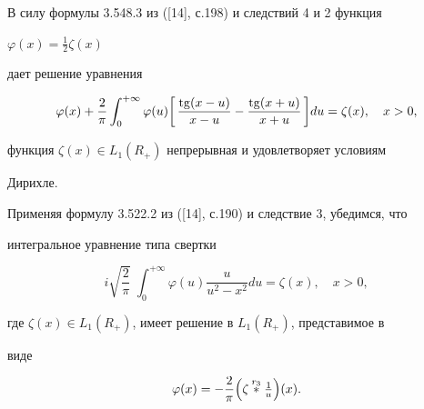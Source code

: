 \begin{exam}


В силу формулы 3.548.3 из ([14], с.198) и следствий 4 и 2 функция


$\varphi(x)=\frac{1}{2}\zeta(x)$


дает решение уравнения


$$


\varphi(x)+\frac{2}{\pi}\int^{+\infty}_0\varphi(u)


\biggl[\,\frac{\tg(x-u)}{x-u}-


\frac{\tg(x+u)}{x+u}\,\biggr]du=\zeta(x),\quad x>0,


$$


функция $\zeta(x)\in L_1(R_+)$ непрерывная и удовлетворяет условиям


Дирихле.


\end{exam}





\begin{exam}


Применяя формулу 3.522.2 из ([14], с.190) и следствие 3, убедимся, что


интегральное уравнение типа свертки


$$


i\sqrt{\frac{2}{\pi}}\;\int^{+\infty}_0\varphi(u)


\frac{u}{u^2-x^2}du=\zeta(x),\quad x>0,


$$


где $\zeta(x)\in L_1(R_+)$, имеет решение в $L_1(R_+)$, представимое в


виде


$$


\varphi(x)=-\frac{2}{\pi}\Bigl(\zeta\up{r_3}{}\tfrac{1}{u}\Bigr)(x).


$$


\end{exam}





